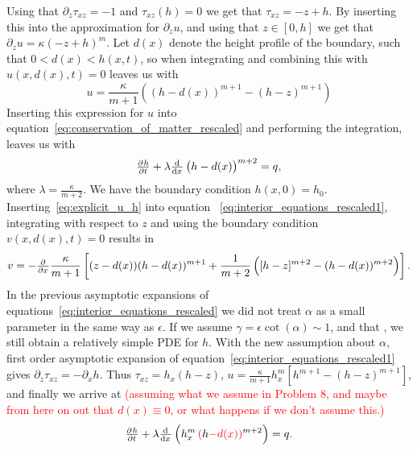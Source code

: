 %
Using that $\partial_{z}\tau_{xz} = -1$ and $\tau_{xz}(h) = 0$ we get that $\tau_{xz} = -z + h$. By inserting this into the approximation for $\partial_{z}u$, and using that $z \in \left[0, h\right]$ we get that $\partial_{z}u = \kappa(-z + h)^{m}$. Let $d(x)$ denote the height profile of the boundary, such that $0<d(x)<h(x,t)$, so when integrating and combining this with $u(x, d(x), t) = 0$ leaves us with 
\begin{equation} \label{eq:explicit_u_h}
u = \frac{\kappa}{m+1}\left( (h-d(x))^{m+1} - (h-z)^{m+1} \right)
\end{equation}
Inserting this expression for $u$ into equation~\eqref{eq:conservation_of_matter_rescaled} and performing the integration, leaves us with
%
\begin{equation}\label{eq:rescaled_conservation_of_matter}
    \pd{{h}}{{t}} + \lambda \od{}{{x}}\left(h-d(x)\right)^{m+2} = q,
\end{equation}
%
where $\lambda = \frac{\kappa}{m+2}$.
%
We have the boundary condition $h(x,0) = h_0$.
%
Inserting~\eqref{eq:explicit_u_h} into equation ~\eqref{eq:interior_equations_rescaled1}, integrating with respect to $z$ and using the boundary condition $v(x,d(x),t) = 0$ results in
%
\begin{equation}
    v = - \pd{}{x} \frac{\kappa}{m+1} \left[ (z-d(x))(h-d(x))^{m+1} + \frac{1}{m+2} \left( [h-z]^{m+2} - (h-d(x))^{m+2} \right) \right].
    \label{eq:explicit_v_h}
\end{equation}
%
In the previous asymptotic expansions of equations~\eqref{eq:interior_equations_rescaled} we did not treat $\alpha$ as a small parameter in the same way as $\epsilon$. If we assume $\gamma = \epsilon \cot(\alpha) \sim 1$, and that , we still obtain a relatively simple PDE for $h$.
%
With the new assumption about $\alpha$, first order asymptotic expansion of equation~\eqref{eq:interior_equations_rescaled1} gives $\partial_z \tau_{xz} = - \partial_x h$. Thus $\tau_{xz} = h_x (h-z)$, $u = \frac{\kappa}{m+1} h_x^m \left[ h^{m+1} - (h-z)^{m+1} \right]$, and finally we arrive at \textcolor{red}{(assuming what we assume in Problem 8, and maybe from here on out that $d(x) \equiv 0$, or what happens if we don't assume this.)}
%
\begin{equation}
    \pd{h}{t} + \lambda \od{}{x} \left(h_x^m \, \red{(}h\red{-d(x))}^{m+2}\right) = q.
\end{equation}
